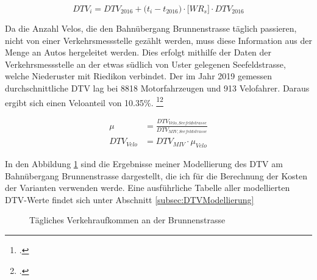 \begin{equation*}
DTV_{i} = DTV_{2016} + \bigl( t_{i} - t_{2016} \bigr) \cdot \bigl[WR_{s}\bigr] \cdot DTV_{2016}
\label{eq.11}
\end{equation*}


Da die Anzahl Velos, die den Bahnübergang Brunnenstrasse täglich passieren, nicht von einer Verkehrsmessstelle gezählt werden, muss diese Information aus der Menge an Autos hergeleitet werden. Dies erfolgt mithilfe der Daten der Verkehrsmessstelle an der etwas südlich von Uster gelegenen Seefeldstrasse, welche Niederuster mit Riedikon verbindet. 
Der im Jahr 2019 gemessen durchschnittliche DTV lag bei 8818 Motorfahrzeugen und 913 Velofahrer. Daraus ergibt sich einen Veloanteil von 10.35\%. \footcite{MIVSeefeld}\footcite{VeloSeefeld}

\begin{align*}
\mu &= \frac{DTV_{Velo,Seefeldstrasse}}{DTV_{MIV,Seefeldstrasse}}   \\
DTV_{Velo} &= DTV_{MIV} \cdot \mu_{Velo} 
\end{align*}

In den Abbildung \ref{fig:DTV} sind die Ergebnisse meiner Modellierung des DTV am Bahnübergang Brunnenstrasse dargestellt, die ich für die Berechnung der Kosten der Varianten verwenden werde. Eine ausführliche Tabelle aller modellierten DTV-Werte findet sich unter Abschnitt \ref{subsec:DTVModellierung}

\begin{figure}[h!]
  \centering
  \hfill
\caption[Verkehrsaufkommen]{Tägliches Verkehraufkommen an der Brunnenstrasse}
  \label{fig:DTV}
\end{figure}



